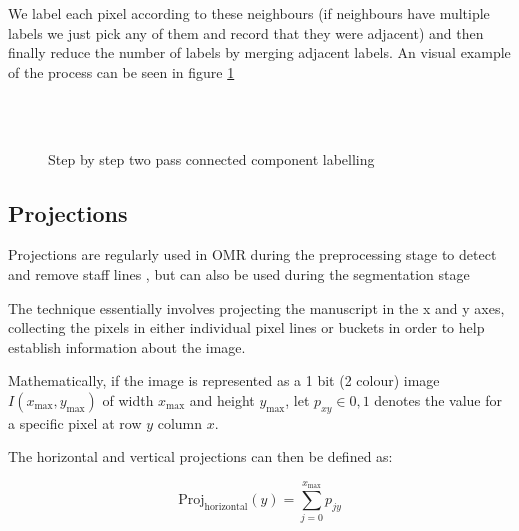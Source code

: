 We label each pixel according to these neighbours (if neighbours have multiple labels we just pick any of them and record that they were adjacent) and then finally reduce the number of labels by merging adjacent labels. An visual example of the process can be seen in figure \ref{fig:ccl-two-pass}



\begin{figure}[h!]
  \centering

  \\
  \quad
  \quad
  \\

  \caption{Step by step two pass connected component labelling}
  \label{fig:ccl-two-pass}
\end{figure}


\subsection{Projections}

Projections are regularly used in OMR during the preprocessing stage to detect and remove staff lines \parencite{rossant2002global}, but can also be used during the segmentation stage

The technique essentially involves projecting the manuscript in the x and y axes, collecting the pixels in either individual pixel lines or buckets in order to help establish information about the image.

Mathematically, if the image is represented as a 1 bit (2 colour) image $I(x_{\text{max}}, y_{\text{max}})$ of width $x_{\text{max}}$ and height $y_{\text{max}}$, let $p_{xy} \in 0, 1$ denotes the value for a specific pixel at row $y$ column $x$.

The horizontal and vertical projections can then be defined as:


\begin{equation} \label{eq:hproj}
  \text{Proj}_{\text{horizontal}}(y) = \sum_{j = 0}^{x_\text{max}} p_{jy}
\end{equation}

